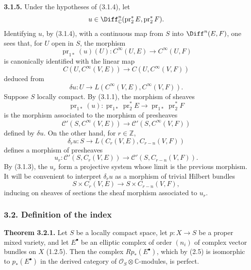 \documentclass[11pt]{article}
\begin{document}
\textbf{3.1.5.} Under the hypotheses of (3.1.4), let
\[
 u\in\Diff^n_{\mathbb C}(\operatorname{pr}_2^*E,\operatorname{pr}_2^*F).
\]
Identifying $u$, by (3.1.4), with a continuous map from $S$ into $\Diff^n(E,F)$, one sees that, for $U$ open in $S$, the morphism
\[
 \operatorname{pr}_{1*}(u)(U):C^\infty(U,E)\longrightarrow C^\infty(U,F)
\]
is canonically identified with the linear map
\[
 C(U,C^\infty(V,E))\longrightarrow C(U,C^\infty(V,F))
\]
deduced from
\[
 \delta u:U\longrightarrow L(C^\infty(V,E),C^\infty(V,F)).
\]
Suppose $S$ locally compact. By (3.1.1), the morphism of sheaves
\[
 \operatorname{pr}_{1*}(u):
 \operatorname{pr}_{1*}\operatorname{pr}_2^*E
 \longrightarrow
 \operatorname{pr}_{1*}\operatorname{pr}_2^*F
\]
is the morphism associated to the morphism of presheaves
\[
 \mathcal C'(S,C^\infty(V,E))\longrightarrow \mathcal C'(S,C^\infty(V,F))
\]
defined by $\delta u$. On the other hand, for $r\in\mathbb Z$,
\[
 \delta_r u:S\longrightarrow L(C_r(V,E),C_{r-n}(V,F))
\]
defines a morphism of presheaves
\[
 u_r:\mathcal C'(S,C_r(V,E))\longrightarrow \mathcal C'(S,C_{r-n}(V,F)).
\]
By (3.1.3), the $u_r$ form a projective system whose limit is the previous morphism. It will be convenient to interpret $\delta_r u$ as a morphism of trivial Hilbert bundles
\[
 S\times C_r(V,E)\longrightarrow S\times C_{r-n}(V,F),
\]
inducing on sheaves of sections the sheaf morphism associated to $u_r$.

\subsubsection*{3.2. Definition of the index}

\textbf{Theorem 3.2.1.} Let $S$ be a locally compact space, let $p:X\to S$ be a proper mixed variety, and let $E^\bullet$ be an elliptic complex of order $(n_i)$ of complex vector bundles on $X$ (1.2.5). Then the complex $Rp_*(E^\bullet)$, which by (2.5) is isomorphic to $p_*(E^\bullet)$ in the derived category of $\mathcal O_S\otimes\mathbb C$-modules, is perfect.
\end{document}
